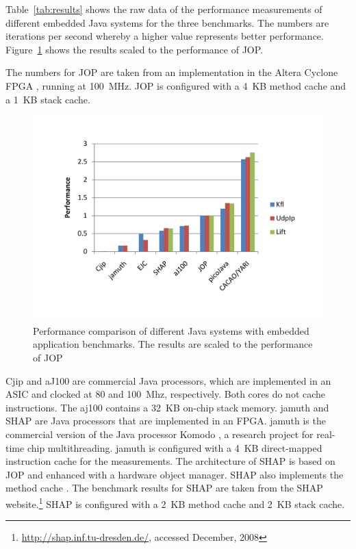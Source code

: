 Table~\ref{tab:results} shows the raw data of the performance
measurements of different embedded Java systems for the three
benchmarks. The numbers are iterations per second whereby a higher
value represents better performance. Figure~\ref{fig:bench} shows the
results scaled to the performance of JOP.

The numbers for JOP are taken from an implementation in the Altera
Cyclone FPGA \cite{AltCyc}, running at 100~MHz. JOP is configured
with a 4~KB method cache and a 1~KB stack cache.

\begin{figure}[t]
    \centering
    \includegraphics[width=\excelwidth]{results/perf}
    \caption{Performance comparison of different Java systems with
    embedded application benchmarks. The results are scaled to the performance of JOP}
    \label{fig:bench}
\end{figure}

   

Cjip \cite{Cjip} and aJ100 \cite{aJile} are commercial Java
processors, which are implemented in an ASIC and clocked at 80 and
100~Mhz, respectively. Both cores do not cache instructions. The
aj100 contains a 32~KB on-chip stack memory. jamuth
\cite{jamuth:jtres07} and SHAP \cite{shap} are Java processors that
are implemented in an FPGA. jamuth is the commercial version of the
Java processor Komodo \cite{komodo2003}, a research project for
real-time chip multithreading. jamuth is configured with a 4~KB
direct-mapped instruction cache for the measurements. The
architecture of SHAP is based on JOP and enhanced with a hardware
object manager. SHAP also implements the method cache
\cite{shap:mcache}. The benchmark results for SHAP are taken from the
SHAP website.\footnote{\url{http://shap.inf.tu-dresden.de/}, accessed
December, 2008} SHAP is configured with a 2~KB method cache and 2~KB
stack cache.

